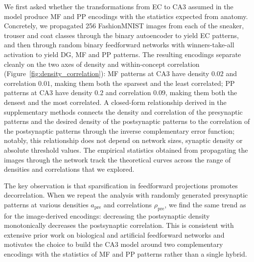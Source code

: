 \documentclass[11pt]{article}
\begin{document}
We first asked whether the transformations from EC to CA3 assumed in the
model produce MF and PP encodings with the statistics expected from
anatomy. Concretely, we propagated 256 FashionMNIST images from each of
the sneaker, trouser and coat classes through the binary autoencoder to
yield EC patterns, and then through random binary feedforward networks with
winners-take-all activation to yield DG, MF and PP patterns. The resulting
encodings separate cleanly on the two axes of density and within-concept
correlation (Figure~\ref{fig:density_correlation}): MF patterns at CA3 have
density $0.02$ and correlation $0.01$, making them both the sparsest and
the least correlated; PP patterns at CA3 have density $0.2$ and correlation
$0.09$, making them both the densest and the most correlated. A closed-form
relationship derived in the supplementary methods connects the density and
correlation of the presynaptic patterns and the desired density of the
postsynaptic patterns to the correlation of the postsynaptic patterns
through the inverse complementary error function; notably, this
relationship does not depend on network sizes, synaptic density or absolute
threshold values. The empirical statistics obtained from propagating the
images through the network track the theoretical curves across the range
of densities and correlations that we explored.

The key observation is that sparsification in feedforward projections
promotes decorrelation. When we repeat the analysis with randomly generated
presynaptic patterns at various densities $a_{\mathrm{pre}}$ and
correlations $\rho_{\mathrm{pre}}$, we find the same trend as for the
image-derived encodings: decreasing the postsynaptic density monotonically
decreases the postsynaptic correlation. This is consistent with extensive
prior work on biological and artificial feedforward networks
\cite{olshausen1996emergence,leutgeb2007pattern} and motivates the choice
to build the CA3 model around two complementary encodings with the
statistics of MF and PP patterns rather than a single hybrid.
\end{document}
